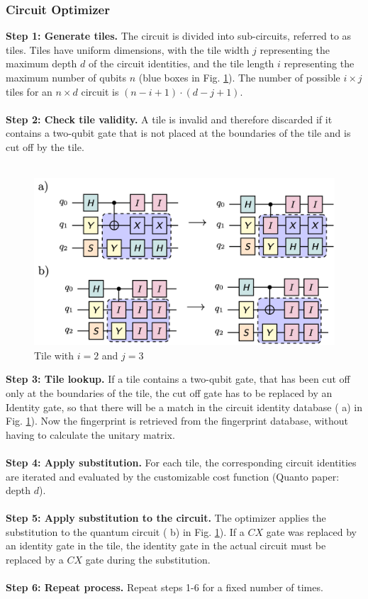 \subsubsection{Circuit Optimizer}
\textbf{Step 1: Generate tiles.}
The circuit is divided into sub-circuits, referred to as tiles. Tiles have uniform dimensions, with the tile width $j$ representing the maximum depth $d$ of the circuit identities, and the tile length $i$ representing the maximum number of qubits $n$ (blue boxes in Fig. \ref{fig:quanto_tile}). The number of possible $i \times j$ tiles for an $n \times d$ circuit is $(n-i+1) \cdot (d-j+1)$.
\\\\
\textbf{Step 2: Check tile validity.}
A tile is invalid and therefore discarded if it contains a two-qubit gate that is not placed at the boundaries of the tile and is cut off by the tile.
\\\\
\begin{figure}
  \includegraphics[width=1\columnwidth]{assets/quanto_tile2.png}
  \caption{Tile with $i=2$ and $j=3$}
  \label{fig:quanto_tile}
\end{figure}
\textbf{Step 3: Tile lookup.}
If a tile contains a two-qubit gate, that has been cut off only at the boundaries of the tile, the cut off gate has to be replaced by an Identity gate, so that there will be a match in the circuit identity database ( a) in Fig. \ref{fig:quanto_tile}). Now the fingerprint is retrieved from the fingerprint database, without having to calculate the unitary matrix. 
\\\\
\textbf{Step 4: Apply substitution.}
For each tile, the corresponding circuit identities are iterated and evaluated by the customizable cost function (Quanto paper: depth $d$).
\\\\
\textbf{Step 5: Apply substitution to the circuit.}
The optimizer applies the substitution to the quantum circuit ( b) in Fig. \ref{fig:quanto_tile}). If a $CX$ gate was replaced by an identity gate in the tile, the identity gate in the actual circuit must be replaced by a $CX$ gate during the substitution. 
\\\\
\textbf{Step 6: Repeat process.}
Repeat steps 1-6 for a fixed number of times.

